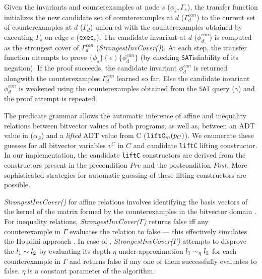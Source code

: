 Given the invariants and counterexamples at node $s$
($\phi_s,\Gamma_s$),
the transfer function initializes the new candidate set
of counterexamples at $d$ ($\Gamma^{can}_{d}$)
to the current set of counterexamples at $d$ ($\Gamma_{d}$) union-ed with
the counterexamples obtained by executing $\Gamma_s$ on edge $e$ ({\tt exec$_e$}).
The candidate invariant at $d$ ($\phi^{can}_d$) is computed
as the strongest cover of $\Gamma^{can}_{d}$ ({\em StrongestInvCover()}).
At each step, the transfer function attempts to prove
$\{\phi_s\} (e) \{\phi^{can}_d\}$ (by checking {\tt SAT}isfiability of its
negation). If the proof succeeds, the candidate invariant $\phi^{can}_d$ is
returned alongwith the counterexamples $\Gamma^{can}_d$ learned so far.
Else the candidate invariant $\phi^{can}_d$ is weakened using
the counterexamples obtained from the {\tt SAT} query ($\gamma$) and the proof attempt is
repeated.

The predicate grammar allows the automatic inference of
affine and inequality relations between bitvector values of both
programs, as well as, \recursiveRelations{} between an ADT value in \SpecL{} ($\alpha_S$)
and a {\em lifted} ADT value from C (${\tt liftC}_m(p_C)$).
We enumerate these \recursiveRelation{}
guesses for all bitvector variables $v^{C}$ in $C$ and candidate {\tt liftC} lifting constructor.
In our implementation, the candidate
{\tt liftC}
constructors are derived from the constructors
present in the precondition $Pre$
and the postcondition $Post$.  More
sophisticated strategies for automatic guessing of
these lifting constructors
are possible.

{\em StrongestInvCover()} for affine relations involves
identifying the basis vectors of the kernel of the
matrix formed by the counterexamples in the bitvector
domain \cite{esop05,semalign}.
For inequality relations, {\em StrongestInvCover($\Gamma$)}
returns false iff any counterexample in $\Gamma$ evaluates the
relation to false --- this effectively simulates the Houdini approach \cite{houdini}.
In case of \recursiveRelations{}, {\em StrongestInvCover($\Gamma$)}
attempts to disprove the \recursiveRelation{} $l_1 \sim{} l_2$ by evaluating
its depth-$\eta$ under-approximation $l_1 \sim_\eta l_2$ for each counterexample
in $\Gamma$ and returns false if any one of them successfully evaluates to false.
$\eta$ is a constant parameter of the algorithm.

